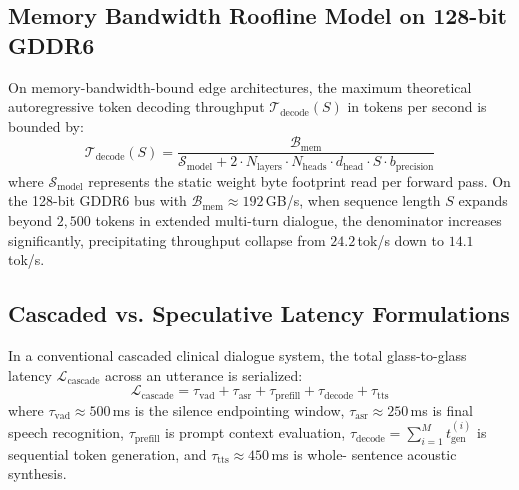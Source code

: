 \documentclass[10pt,journal,compsoc]{IEEEtran}
\begin{document}
\subsection{Memory Bandwidth Roofline Model on 128-bit GDDR6}
On memory-bandwidth-bound edge architectures, the maximum theoretical autoregressive token decoding throughput $\mathcal{T}_{\text{decode}}(S)$ in tokens per second is bounded by:
\begin{equation}
    \mathcal{T}_{\text{decode}}(S) = \frac{\mathcal{B}_{\text{mem}}}{\mathcal{S}_{\text{model}} + 2 \cdot N_{\text{layers}} \cdot N_{\text{heads}} \cdot d_{\text{head}} \cdot S \cdot b_{\text{precision}}}
\end{equation}
where $\mathcal{S}_{\text{model}}$ represents the static weight byte footprint read per forward pass. On the 128-bit GDDR6 bus with $\mathcal{B}_{\text{mem}} \approx 192$\,GB/s, when sequence length $S$ expands beyond $2{,}500$ tokens in extended multi-turn dialogue, the denominator increases significantly, precipitating throughput
collapse from $24.2$\,tok/s down to $14.1$\,tok/s.

\subsection{Cascaded vs. Speculative Latency Formulations}
In a conventional cascaded clinical dialogue system, the total glass-to-glass latency $\mathcal{L}_{\text{cascade}}$ across an utterance is serialized:
\begin{equation}
    \mathcal{L}_{\text{cascade}} = \tau_{\text{vad}} + \tau_{\text{asr}} + \tau_{\text{prefill}} + \tau_{\text{decode}} + \tau_{\text{tts}}
\end{equation}
where $\tau_{\text{vad}} \approx 500$\,ms is the silence endpointing window, $\tau_{\text{asr}} \approx 250$\,ms is final speech recognition, $\tau_{\text{prefill}}$ is prompt context evaluation, $\tau_{\text{decode}} = \sum_{i=1}^M t_{\text{gen}}^{(i)}$ is sequential token generation, and $\tau_{\text{tts}} \approx 450$\,ms is whole-
sentence acoustic synthesis.
\end{document}
